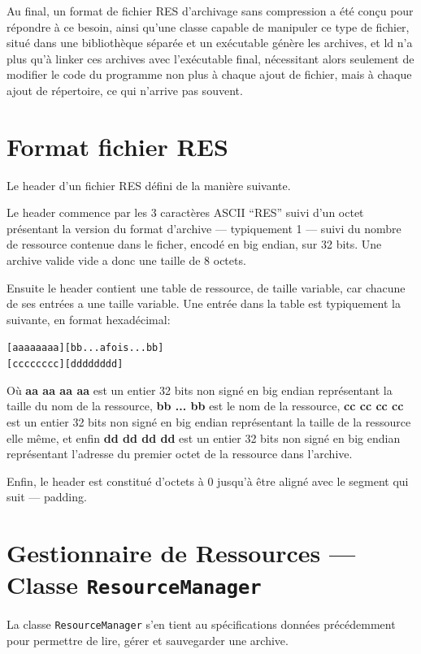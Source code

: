 \documentclass[pdftex, 11pt, a4paper, titlepage]{article}
\begin{document}
Au final, un format de fichier RES d'archivage sans compression a été
conçu pour répondre à ce besoin, ainsi qu'une classe capable de
manipuler ce type de fichier, situé dans une bibliothèque séparée et
un exécutable génère les archives, et ld n'a plus qu'à linker ces
archives avec l'exécutable final, nécessitant alors seulement de
modifier le code du programme non plus à chaque ajout de fichier, mais
à chaque ajout de répertoire, ce qui n'arrive pas souvent.

\pagebreak

\section{Format fichier RES}

Le header d'un fichier RES défini de la manière suivante.

Le header commence par les 3 caractères ASCII ``RES'' suivi d'un octet
présentant la version du format d'archive --- typiquement 1 --- suivi
du nombre de ressource contenue dans le ficher, encodé en big endian,
sur 32 bits.  Une archive valide vide a donc une taille de 8 octets.

Ensuite le header contient une table de ressource, de taille variable,
car chacune de ses entrées a une taille variable.  Une entrée dans la
table est typiquement la suivante, en format hexadécimal:

\begin{alltt}
[ aa aa aa aa ] [ bb {... a fois ...} bb]
[ cc cc cc cc] [ dd dd dd dd ]
\end{alltt}

Où \textbf{aa aa aa aa} est un entier 32 bits non signé en big endian
représentant la taille du nom de la ressource, \textbf{bb ... bb} est
le nom de la ressource, \textbf{cc cc cc cc} est un entier 32 bits non
signé en big endian représentant la taille de la ressource elle même,
et enfin \textbf{dd dd dd dd} est un entier 32 bits non signé en big
endian représentant l'adresse du premier octet de la ressource dans
l'archive.

Enfin, le header est constitué d'octets à 0 jusqu'à être aligné avec
le segment qui suit --- padding.

\section{Gestionnaire de Ressources --- Classe
  \texttt{ResourceManager}}

La classe \texttt{ResourceManager} s'en tient au spécifications
données précédemment pour permettre de lire, gérer et sauvegarder une
archive.
\end{document}
